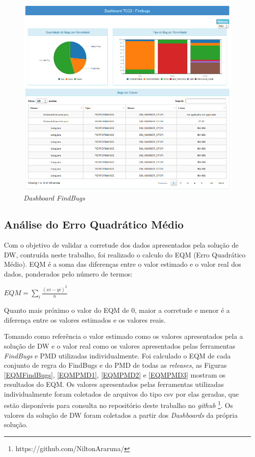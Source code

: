 \begin{figure}[H]
\centering
\includegraphics[keepaspectratio=false,scale=0.55]{figuras/figuras_nilton/DashboardFindbugs.png}
\caption{\textit{Dashboard FindBugs}}
\label{dashboardCenarios}
\end{figure}


\subsection{Análise do Erro Quadrático Médio}
\label{eqm}

Com o objetivo de validar a corretude dos dados apresentados pela solução de DW, contruída neste trabalho, foi realizado o calculo do EQM (Erro Quadrático Médio). EQM é a soma das diferenças entre
o valor estimado e o valor real dos dados, ponderados pelo número de termos: 

$ EQM = \sum\limits_{i}\frac{(x{i}-y{i})^{2}}{n} $

Quanto mais próximo o valor do EQM de 0, maior a corretude e menor é a diferença entre os valores estimados e os valores reais.

Tomando como referência o valor estimado como os valores apresentados pela a solução de DW e o valor real como os valores apresentados pelas ferramentas \textit{FindBugs} e PMD utilizadas individualmente. Foi calculado o EQM de cada conjunto de regra do FindBugs e do PMD de todas as \textit{releases}, as Figuras \ref{EQMFindBugs}, \ref{EQMPMD1}, \ref{EQMPMD2} e \ref{EQMPMD3} mostram os resultados do EQM. Os valores apresentados pelas ferramentas utilizadas individualmente foram coletados de arquivos do tipo csv por elas geradas, que estão disponíveis para consulta no repositório deste trabalho no \textit{github} \footnote{https://github.com/NiltonAraruna/}. Os valores da solução de DW foram coletados a partir dos \textit{Dashboards} da própria solução. 

